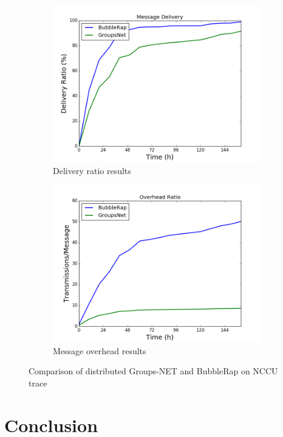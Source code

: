 \begin{figure}
    \begin{subfigure}[b]{0.5\columnwidth}
        \includegraphics[width=\linewidth]{imgs/groups-net/GroupsNet-delivery.png}
        \caption{Delivery ratio results}
        \label{fig:groupMessageDelivery}
    \end{subfigure}
    \hfill %
    \begin{subfigure}[b]{0.5\columnwidth}
        \includegraphics[width=\linewidth]{imgs/groups-net/GroupsNET-overhead.png}
        \caption{Message overhead results}
        \label{fig:groupOverhead}
    \end{subfigure}

    \caption{Comparison of distributed Groups-NET and BubbleRap on NCCU trace}
    \label{fig:groupSimulationResults}
\end{figure}


\section{Conclusion}
\label{sec:GNConclusion}




